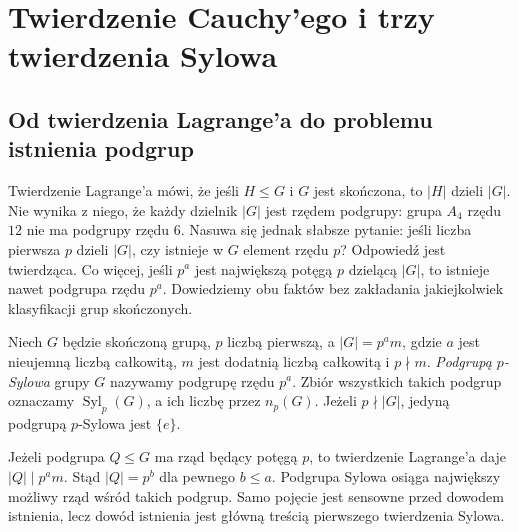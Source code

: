 \chapter{Twierdzenie Cauchy'ego i trzy twierdzenia Sylowa}
\label{aa:ch:sylow}

\section{Od twierdzenia Lagrange'a do problemu istnienia podgrup}
Twierdzenie Lagrange'a mówi, że jeśli $H\le G$ i $G$ jest
skończona, to $|H|$ dzieli $|G|$. Nie wynika z niego, że
każdy dzielnik $|G|$ jest rzędem podgrupy: grupa $A_4$ rzędu
$12$ nie ma podgrupy rzędu $6$.
Nasuwa się jednak słabsze pytanie: jeśli liczba pierwsza $p$
dzieli $|G|$, czy istnieje w $G$ element rzędu $p$?
Odpowiedź jest twierdząca. Co więcej, jeśli $p^a$ jest
największą potęgą $p$ dzielącą $|G|$, to istnieje nawet
podgrupa rzędu $p^a$. Dowiedziemy obu faktów bez zakładania
jakiejkolwiek klasyfikacji grup skończonych.

\begin{definicja}
\label{aa:def:sylow}
Niech $G$ będzie skończoną grupą, $p$ liczbą pierwszą,
a $|G|=p^a m$, gdzie $a$ jest nieujemną liczbą całkowitą,
$m$ jest dodatnią liczbą całkowitą i $p\nmid m$.
\emph{Podgrupą $p$-Sylowa} grupy $G$ nazywamy podgrupę
rzędu $p^a$. Zbiór wszystkich takich podgrup oznaczamy
$\operatorname{Syl}_p(G)$, a ich liczbę przez $n_p(G)$.
Jeżeli $p\nmid|G|$, jedyną podgrupą $p$-Sylowa jest $\{e\}$.
\end{definicja}

\begin{uwaga}
Jeżeli podgrupa $Q\le G$ ma rząd będący potęgą $p$,
to twierdzenie Lagrange'a daje $|Q|\mid p^a m$.
Stąd $|Q|=p^b$ dla pewnego $b\le a$. Podgrupa Sylowa
osiąga największy możliwy rząd wśród takich podgrup.
Samo pojęcie jest sensowne przed dowodem istnienia,
lecz dowód istnienia jest główną treścią pierwszego twierdzenia Sylowa.
\end{uwaga}

